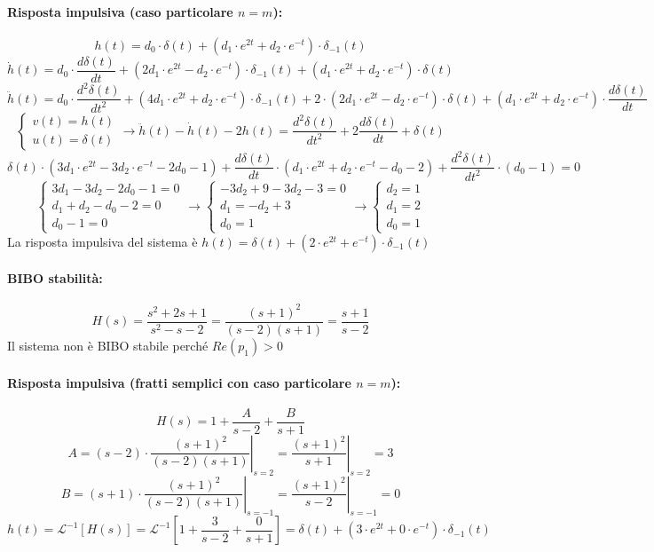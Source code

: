 \documentclass[a4paper]{article}
\begin{document}
	\paragraph{Risposta impulsiva (caso particolare $n=m$):}
	\[ h(t) = d_0 \cdot \delta(t) + (d_1 \cdot e^{2t} + d_2 \cdot e^{-t}) \cdot \delta_{-1}(t) \]
	\[
	\dot{h}(t) = d_0 \cdot \frac{d \delta(t)}{dt} + (2d_1 \cdot e^{2t} - d_2 \cdot e^{-t}) \cdot \delta_{-1}(t) + (d_1 \cdot e^{2t} + d_2 \cdot e^{-t}) \cdot \delta(t)
	\]
	\[
	\ddot{h}(t) = d_0 \cdot \frac{d^2 \delta(t)}{dt^2}
	+ (4d_1 \cdot e^{2t} + d_2 \cdot e^{-t}) \cdot \delta_{-1}(t)
	+ 2 \cdot (2d_1 \cdot e^{2t} - d_2 \cdot e^{-t}) \cdot \delta(t)
	+ (d_1 \cdot e^{2t} + d_2 \cdot e^{-t}) \cdot \frac{d \delta(t)}{dt}
	\]
	\[
	\begin{cases}
		v(t) = h(t) \\
		u(t) = \delta(t)
	\end{cases}
	\longrightarrow
	\ddot{h}(t) - \dot{h}(t) -2 h(t) = \frac{d^2 \delta(t)}{dt^2} + 2 \frac{d \delta(t)}{dt} + \delta(t)
	\]
	\[
	\delta(t) \cdot (3d_1 \cdot e^{2t} - 3d_2 \cdot e^{-t} - 2d_0 - 1)
	+ \frac{d \delta(t)}{dt} \cdot (d_1 \cdot e^{2t} + d_2 \cdot e^{-t} - d_0 - 2)
	+ \frac{d^2 \delta(t)}{dt^2} \cdot (d_0 - 1) = 0
	\]
	\[
	\begin{cases}
		3d_1 - 3d_2 - 2d_0 - 1 = 0 \\
		d_1 + d_2 - d_0 - 2 = 0 \\
		d_0 - 1 = 0
	\end{cases}
	\longrightarrow
	\begin{cases}
		-3d_2 + 9 - 3d_2 - 3 = 0 \\
		d_1 = -d_2 + 3 \\
		d_0 = 1
	\end{cases}
	\longrightarrow
	\begin{cases}
		d_2 = 1 \\
		d_1 = 2 \\
		d_0 = 1
	\end{cases}
	\]
	La risposta impulsiva del sistema è $h(t) = \delta(t) + (2 \cdot e^{2t} + e^{-t}) \cdot \delta_{-1}(t)$
	
	\paragraph{BIBO stabilità:}
	\[ H(s) = \frac{s^2 + 2s + 1}{s^2 - s - 2} = \frac{(s + 1)^2}{(s - 2)(s + 1)} = \frac{s+1}{s-2} \]
	Il sistema non è BIBO stabile perché $Re(p_1)>0$
	
	\paragraph{Risposta impulsiva (fratti semplici con caso particolare $n=m$):}
	\[ H(s) = 1 + \frac{A}{s - 2} + \frac{B}{s + 1} \]
	\[ A = \left. (s-2) \cdot \frac{(s + 1)^2}{(s - 2)(s + 1)} \right|_{s=2} = \left. \frac{(s + 1)^2}{s + 1} \right|_{s=2} = 3 \]
	\[ B = \left. (s+1) \cdot \frac{(s + 1)^2}{(s - 2)(s + 1)} \right|_{s=-1} = \left. \frac{(s + 1)^2}{s - 2} \right|_{s=-1} = 0 \]
	\[
	h(t) = \mathcal{L}^{-1} [H(s)] = \mathcal{L}^{-1} \left[ 1 + \frac{3}{s - 2} + \frac{0}{s + 1} \right]
	= \delta(t) + \left( 3 \cdot e^{2t} + 0 \cdot e^{-t} \right) \cdot \delta_{-1}(t)
	\]
	
\end{document}
